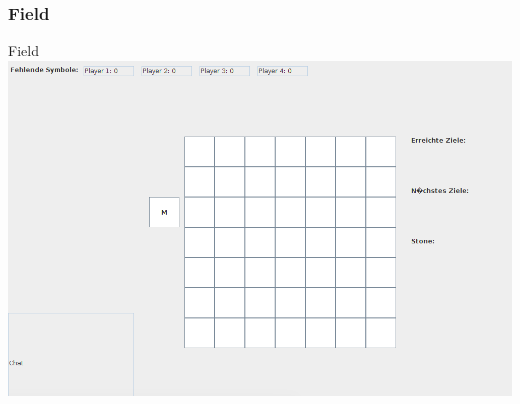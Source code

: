 \documentclass{beamer}
\begin{document}
		    \label{Frame3}	
			\begin{frame}
				\frametitle{Field}
				\begin{block}{Field}
					\includegraphics[scale=0.27]{Bilder/bild3.png}
				\end{block}		
			\end{frame}
\end{document}
